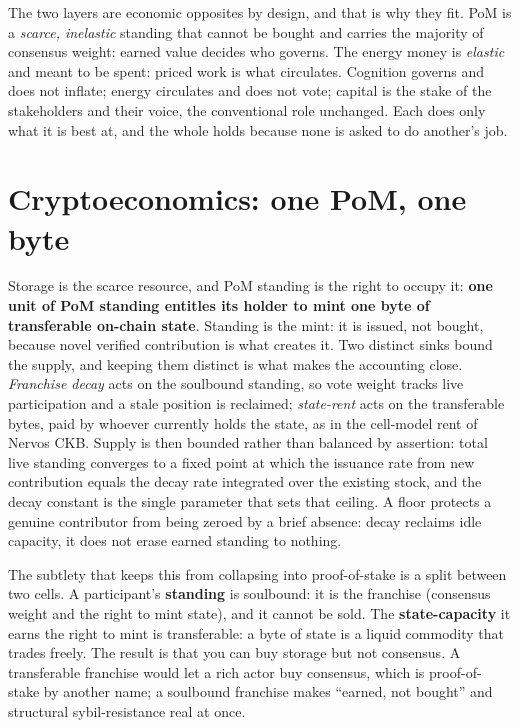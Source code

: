 \documentclass[10pt]{article}
\begin{document}
The two layers are economic opposites by design, and that is why they fit. PoM is a \emph{scarce,
inelastic} standing that cannot be bought and carries the majority of consensus weight: earned value
decides who governs. The energy money is \emph{elastic} and meant to be spent: priced work is what
circulates. Cognition governs and does not inflate; energy circulates and does not vote; capital is the stake of the
stakeholders and their voice, the conventional role unchanged. Each does only what it is best at, and the
whole holds because none is asked to do another's job.

\section{Cryptoeconomics: one PoM, one byte}

Storage is the scarce resource, and PoM standing is the right to occupy it: \textbf{one unit of PoM
standing entitles its holder to mint one byte of transferable on-chain state}. Standing is the mint:
it is issued, not bought, because novel verified contribution is what creates it. Two distinct sinks
bound the supply, and keeping them distinct is what makes the accounting close. \emph{Franchise decay}
acts on the soulbound standing, so vote weight tracks live participation and a stale position is
reclaimed; \emph{state-rent} acts on the transferable bytes, paid by whoever currently holds the state,
as in the cell-model rent of Nervos CKB. Supply is then bounded rather than balanced by assertion: total
live standing converges to a fixed point at which the issuance rate from new contribution equals the
decay rate integrated over the existing stock, and the decay constant is the single parameter that sets
that ceiling. A floor protects a genuine contributor from being zeroed by a brief absence: decay reclaims
idle capacity, it does not erase earned standing to nothing.

The subtlety that keeps this from collapsing into proof-of-stake is a split between two cells. A
participant's \textbf{standing} is \textcolor{sb}{soulbound}: it is the franchise (consensus weight and
the right to mint state), and it cannot be sold. The \textbf{state-capacity} it earns the right to mint
is \textcolor{tr}{transferable}: a byte of state is a liquid commodity that trades freely. The result
is that you can buy storage but not consensus. A transferable franchise would let a rich actor buy
consensus, which is proof-of-stake by another name; a soulbound franchise makes ``earned, not bought''
and structural sybil-resistance real at once.
\end{document}
